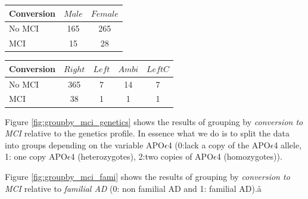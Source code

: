\documentclass[11pt]{article}
\theoremstyle{definition}
\theoremstyle{remark}
\begin{document}
\begin{minipage}[b]{.40\textwidth}
   \centering
    \begin{tabular}[t]{lcc}
    \hline
    Conversion&{$Male$}&{$Female$} \\
    \hline
    No MCI&165&265\\
    MCI&15&28\\
    \hline
  \end{tabular}
   \label{tab:sexomci}
\end{minipage}\qquad
\begin{minipage}[b]{.40\textwidth}
   \centering
    \begin{tabular}[t]{lcccc}
    \hline
    Conversion&{$Right$}&{$Left$}&{$Ambi$}&{$LeftC$} \\
    \hline
    No MCI&365&7&14&7\\
    MCI&38&1&1&1\\
    \hline
  \end{tabular}
   \label{tab:handmci}
\end{minipage}

Figure \ref{fig:groupby_mci_genetics} shows the results of grouping by \emph{conversion to MCI} relative to the genetics profile. In essence what we do is to split the data into groups depending on the variable APO$\epsilon$4 (0:lack a copy of the APO$\epsilon$4 allele, 1: one copy APO$\epsilon$4 (heterozygotes), 2:two copies of APO$\epsilon$4 (homozygotes)). 

Figure \ref{fig:groupby_mci_fami} shows the results of grouping by \emph{conversion to MCI} relative to \emph{familial AD} (0: non familial AD and 1: familial AD).å
\end{document}
